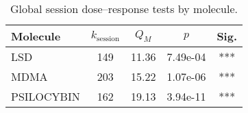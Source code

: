\begin{table}[htbp]
  \centering
  \caption{Global session dose--response tests by molecule.}
  \label{tab:dr-global-session}
  \begin{tabular}{lcccc}
    \toprule
    Molecule & $k_{\text{session}}$ & $Q_M$ & $p$ & Sig. \\
    \midrule
    LSD & 149 & 11.36 & 7.49e-04 & *** \\
    MDMA & 203 & 15.22 & 1.07e-06 & *** \\
    PSILOCYBIN & 162 & 19.13 & 3.94e-11 & *** \\
    \bottomrule
  \end{tabular}
\end{table}
